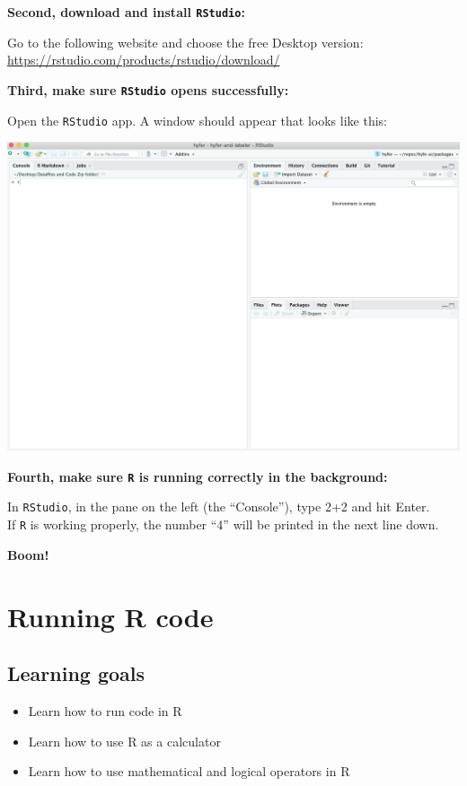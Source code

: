 \documentclass[
]{book}
\providecommand{\tightlist}{%
  \setlength{\itemsep}{0pt}\setlength{\parskip}{0pt}}
\begin{document}
\textbf{Second, download and install \texttt{RStudio}:}

Go to the following website and choose the free Desktop version:
\url{https://rstudio.com/products/rstudio/download/}

\textbf{Third, make sure \texttt{RStudio} opens successfully:}

Open the \texttt{RStudio} app. A window should appear that looks like this:

\includegraphics{img/rstudio_firstopen.png}

\textbf{Fourth, make sure \texttt{R} is running correctly in the background:}

In \texttt{RStudio}, in the pane on the left (the ``Console''), type 2+2 and hit Enter.\\
If \texttt{R} is working properly, the number ``4'' will be printed in the next line down.

\textbf{Boom!}

\hypertarget{running-r-code}{%
\chapter{Running R code}\label{running-r-code}}

\hypertarget{learning-goals}{%
\section*{Learning goals}\label{learning-goals}}

\begin{itemize}
\tightlist
\item
  Learn how to run code in R
\item
  Learn how to use R as a calculator
\item
  Learn how to use mathematical and logical operators in R
\end{itemize}
\end{document}
